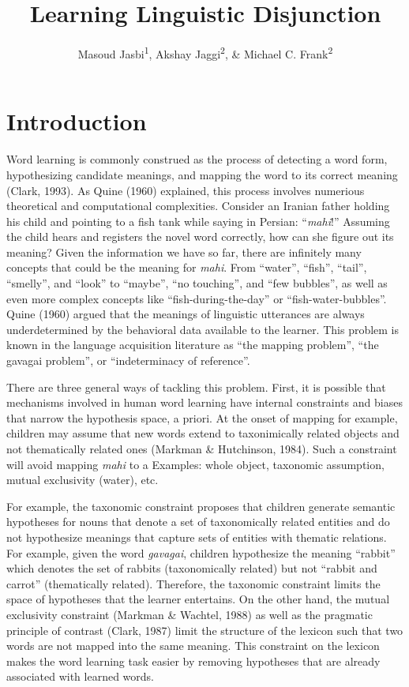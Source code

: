 \documentclass[,man,floatsintext]{apa6}
\title{Learning Linguistic Disjunction}
\author{Masoud Jasbi\textsuperscript{1}, Akshay Jaggi\textsuperscript{2}, \& Michael C. Frank\textsuperscript{2}}
\date{}
\affiliation{
\vspace{0.5cm}
\textsuperscript{1} Harvard University\\\textsuperscript{2} Stanford University}
\begin{document}
\maketitle

\hypertarget{introduction}{%
\section{Introduction}\label{introduction}}

Word learning is commonly construed as the process of detecting a word form, hypothesizing candidate meanings, and mapping the word to its correct meaning (Clark, 1993). As Quine (1960) explained, this process involves numerious theoretical and computational complexities. Consider an Iranian father holding his child and pointing to a fish tank while saying in Persian: \enquote{\emph{mahi}!} Assuming the child hears and registers the novel word correctly, how can she figure out its meaning? Given the information we have so far, there are infinitely many concepts that could be the meaning for \emph{mahi}. From \enquote{water}, \enquote{fish}, \enquote{tail}, \enquote{smelly}, and \enquote{look} to \enquote{maybe}, \enquote{no touching}, and \enquote{few bubbles}, as well as even more complex concepts like \enquote{fish-during-the-day} or \enquote{fish-water-bubbles}. Quine (1960) argued that the meanings of linguistic utterances are always underdetermined by the behavioral data available to the learner. This problem is known in the language acquisition literature as \enquote{the mapping problem}, \enquote{the gavagai problem}, or \enquote{indeterminacy of reference}.

There are three general ways of tackling this problem. First, it is possible that mechanisms involved in human word learning have internal constraints and biases that narrow the hypothesis space, a priori. At the onset of mapping for example, children may assume that new words extend to taxonimically related objects and not thematically related ones (Markman \& Hutchinson, 1984). Such a constraint will avoid mapping \emph{mahi} to a Examples: whole object, taxonomic assumption, mutual exclusivity (water), etc.

For example, the taxonomic constraint proposes that children generate semantic hypotheses for nouns that denote a set of taxonomically related entities and do not hypothesize meanings that capture sets of entities with thematic relations. For example, given the word \emph{gavagai}, children hypothesize the meaning \enquote{rabbit} which denotes the set of rabbits (taxonomically related) but not \enquote{rabbit and carrot} (thematically related). Therefore, the taxonomic constraint limits the space of hypotheses that the learner entertains. On the other hand, the mutual exclusivity constraint (Markman \& Wachtel, 1988) as well as the pragmatic principle of contrast (Clark, 1987) limit the structure of the lexicon such that two words are not mapped into the same meaning. This constraint on the lexicon makes the word learning task easier by removing hypotheses that are already associated with learned words.
\end{document}
